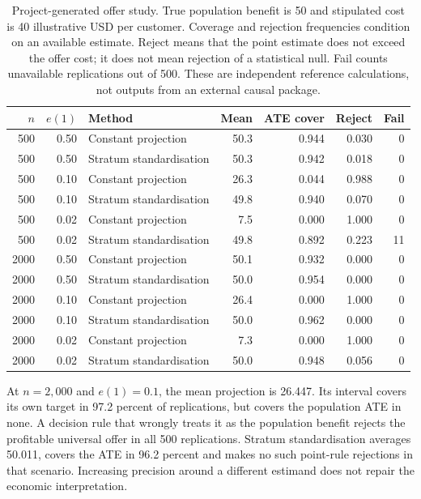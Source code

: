 \begin{table}[htbp]
\centering\small
\begin{tabular}{rrlrrrr}
\toprule
$n$ & $e(1)$ & Method & Mean & ATE cover & Reject & Fail \\
\midrule
500 & 0.50 & Constant projection & 50.3 & 0.944 & 0.030 & 0 \\
500 & 0.50 & Stratum standardisation & 50.3 & 0.942 & 0.018 & 0 \\
500 & 0.10 & Constant projection & 26.3 & 0.044 & 0.988 & 0 \\
500 & 0.10 & Stratum standardisation & 49.8 & 0.940 & 0.070 & 0 \\
500 & 0.02 & Constant projection & 7.5 & 0.000 & 1.000 & 0 \\
500 & 0.02 & Stratum standardisation & 49.8 & 0.892 & 0.223 & 11 \\
2000 & 0.50 & Constant projection & 50.1 & 0.932 & 0.000 & 0 \\
2000 & 0.50 & Stratum standardisation & 50.0 & 0.954 & 0.000 & 0 \\
2000 & 0.10 & Constant projection & 26.4 & 0.000 & 1.000 & 0 \\
2000 & 0.10 & Stratum standardisation & 50.0 & 0.962 & 0.000 & 0 \\
2000 & 0.02 & Constant projection & 7.3 & 0.000 & 1.000 & 0 \\
2000 & 0.02 & Stratum standardisation & 50.0 & 0.948 & 0.056 & 0 \\
\bottomrule
\end{tabular}
\caption{Project-generated offer study. True population benefit is 50 and
stipulated cost is 40 illustrative USD per customer. Coverage and rejection
frequencies condition on an available estimate. Reject means that the point
estimate does not exceed the offer cost; it does not mean rejection of a
statistical null. Fail counts unavailable replications out of 500. These are independent reference calculations,
not outputs from an external causal package.}
\label{scisyn:offer-results}
\end{table}




At $n=2{,}000$ and $e(1)=0.1$, the mean projection is 26.447. Its interval covers
its own target in 97.2 percent of replications, but covers the population ATE in
none. A decision rule that wrongly treats it as the population benefit rejects
the profitable universal offer in all 500 replications. Stratum standardisation
averages 50.011, covers the ATE in 96.2 percent and makes no such point-rule
rejections in that scenario. Increasing precision around a different estimand
does not repair the economic interpretation.

